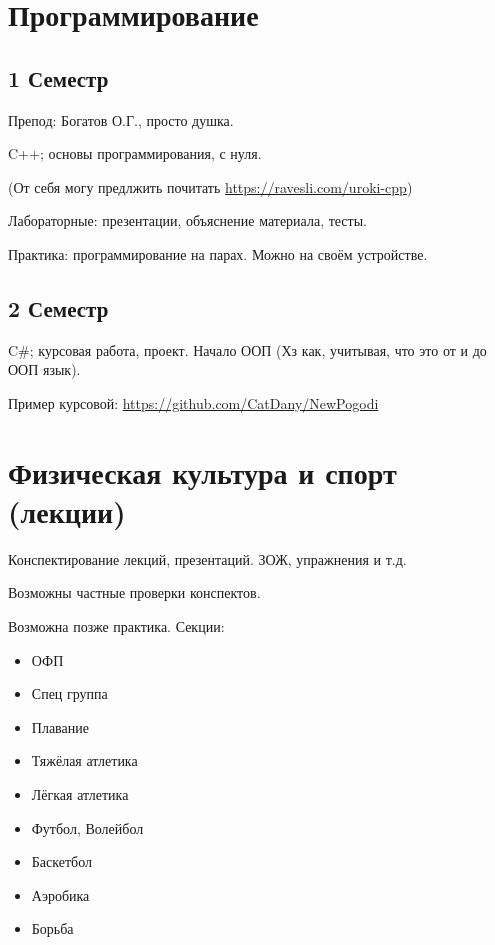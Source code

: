 \documentclass[11pt]{article}
\author{Krutko Nikita / KrutNA}
\date{\today}
\title{}
\begin{document}
\tableofcontents


\section{Программирование}
\label{sec:orga5b3b3d}

\subsection{1 Семестр}
\label{sec:orgd480777}

Препод: Богатов О.Г., просто душка. 

C++; основы программирования, с нуля.

(От себя могу предлжить почитать \url{https://ravesli.com/uroki-cpp})

Лабораторные: презентации, объяснение материала, тесты.

Практика: программирование на парах. Можно на своём устройстве.

\subsection{2 Семестр}
\label{sec:org7e98bab}

C\#; курсовая работа, проект. Начало ООП (Хз как, учитывая, что это от и до ООП язык).

Пример курсовой: \url{https://github.com/CatDany/NewPogodi}

\section{Физическая культура и спорт (лекции)}
\label{sec:org0cd69b3}

Конспектирование лекций, презентаций. ЗОЖ, упражнения и т.д.

Возможны частные проверки конспектов.

Возможна позже практика.
Секции: 
\begin{itemize}
\item ОФП
\item Спец группа
\item Плавание
\item Тяжёлая атлетика
\item Лёгкая атлетика
\item Футбол, Волейбол
\item Баскетбол
\item Аэробика
\item Борьба
\end{itemize}
\end{document}
